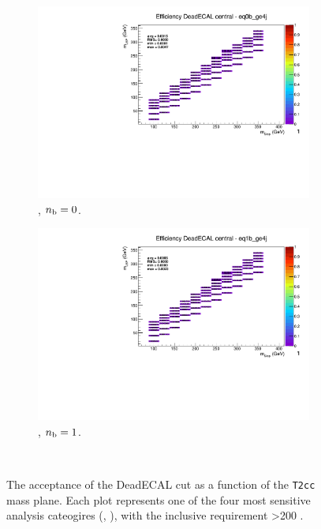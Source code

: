 \begin{figure}[h!]
  \begin{subfigure}[b]{0.4\textwidth}
    \includegraphics[width=\textwidth, page=5]{Figs/sms/t2cc/v37/systs/T2cc_DeadECAL_eq0b_ge4j.pdf}
    \caption{\njhigh, $n_{\text{b}} = 0$.}
  \end{subfigure}
  \begin{subfigure}[b]{0.4\textwidth}
    \includegraphics[width=\textwidth, page=5]{Figs/sms/t2cc/v37/systs/T2cc_DeadECAL_eq1b_ge4j.pdf}
    \caption{\njhigh, $n_{\text{b}} = 1$.}
  \end{subfigure}\\
  \caption{The acceptance of the DeadECAL cut as a function of the \texttt{T2cc}
  mass plane. Each plot represents one of the four most sensitive 
  analysis cateogires (\nb, \nj), with the inclusive requirement \HT>200 \gev.}
  \label{fig:sms-deadecal-t2cc}
\end{figure}


